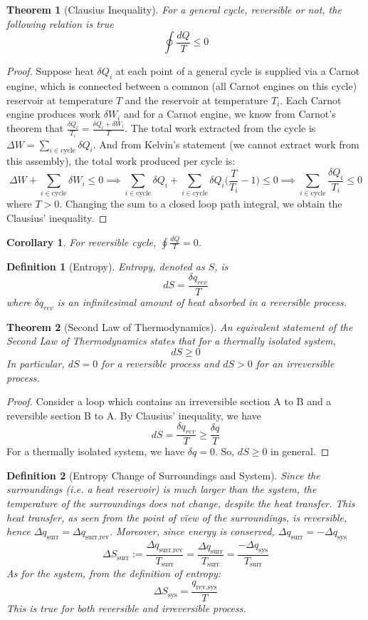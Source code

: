 \documentclass[a4paper]{article}
\theoremstyle{new}
\newtheorem{defi}{Definition}[section]
\newtheorem{thm}{Theorem}[section]
\newtheorem{cor}{Corollary}[section]
\begin{document}
\begin{thm}[Clausius Inequality]
For a general cycle, reversible or not, the following relation is true
$$\oint\frac{dQ}{T}\leq 0$$
\end{thm}
\begin{proof}
Suppose heat $\delta Q_i$ at each point of a general cycle is supplied via a Carnot engine, which is connected between a common (all Carnot engines on this cycle) reservoir at temperature $T$ and the reservoir at temperature $T_i$. Each Carnot engine produces work $\delta W_i$ and for a Carnot engine, we know from Carnot's theorem that $\frac{\delta Q_i}{T_i}=\frac{\delta Q_i+\delta W_i}{T}$. The total work extracted from the cycle is $\Delta W=\sum_{i\in\text{cycle}}\delta Q_i$. And from Kelvin's statement (we cannot extract work from this assembly), the total work produced per cycle is:
$$\Delta W+\sum_{i\in\text{cycle}}\delta W_i\leq 0\implies\sum_{i\in\text{cycle}}\delta Q_i+\sum_{i\in\text{cycle}}\delta Q_i\bigg(\frac{T}{T_i}-1\bigg)\leq0\implies \sum_{i\in\text{cycle}}\frac{\delta Q_i}{T_i}\leq 0$$
where $T>0$. Changing the sum to a closed loop path integral, we obtain the Clausius' inequality.
\end{proof}
\begin{cor}
For reversible cycle, $\oint\frac{dQ}{T}=0$.
\end{cor}
\begin{defi}[Entropy]
Entropy, denoted as $S$, is $$dS=\frac{\delta q_{rev}}{T}$$ where $\delta q_{rev}$ is an infinitesimal amount of heat absorbed in a reversible process. 
\end{defi}
\begin{thm}[Second Law of Thermodynamics]
An equivalent statement of the Second Law of Thermodynamics states that for a thermally isolated system,
$$dS\geq0$$
In particular, $dS=0$ for a reversible process and $dS>0$ for an irreversible process.
\end{thm}
\begin{proof}
Consider a loop which contains an irreversible section A to B and a reversible section B to A. By Clausius' inequality, we have
$$dS=\frac{\delta q_{rev}}{T}\geq\frac{\delta q}{T}$$
For a thermally isolated system, we have $\delta q=0$. So, $dS\geq0$ in general.
\end{proof}
\begin{defi}[Entropy Change of Surroundings and System]
Since the surroundings (i.e. a heat reservoir) is much larger than the system, the temperature of the surroundings does not change, despite the heat transfer. This heat transfer, as seen from the point of view of the surroundings, is reversible, hence $\Delta q_{\text{surr}}=\Delta q_{\text{surr,rev}}$. Moreover, since energy is conserved, $\Delta q_{\text{surr}}=-\Delta q_{\text{sys}}$
$$\Delta S_{\text{surr}}:=\frac{\Delta q_{\text{surr,rev}}}{T_{\text{surr}}}=\frac{\Delta q_{\text{surr}}}{T_{\text{surr}}}=\frac{-\Delta q_{\text{sys}}}{T_{\text{surr}}}$$
As for the system, from the definition of entropy:
$$\Delta S_{\text{sys}}=\frac{q_{\text{rev,sys}}}{T}$$
This is true for both reversible and irreversible process.
\end{defi}
\end{document}

